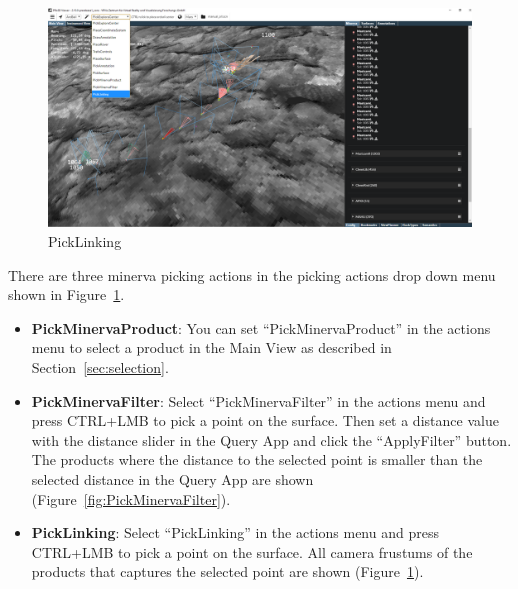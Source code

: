 \begin{figure}[h]
				\centering
					\includegraphics[width=1\textwidth]{pics/PickLinking1.png}
				\caption[Pick Linking]{PickLinking}
				\label{fig:PickLinking}
		 \end{figure}
		

There are three minerva picking actions in the picking actions drop down menu shown in Figure~\ref{fig:PickLinking}.
\\
\begin{itemize}
  \item \textbf{PickMinervaProduct}: You can set ``PickMinervaProduct'' in the actions menu to select a product in the Main View as described in Section~\ref{sec:selection}.
	\item \textbf{PickMinervaFilter}: Select ``PickMinervaFilter'' in the actions menu and press CTRL+LMB to pick a point on the surface. Then set a distance value with the distance slider in the Query App and click the ``ApplyFilter'' button. The products where the distance to the selected point is smaller than the selected distance in the Query App are shown (Figure~\ref{fig:PickMinervaFilter}).
	\item \textbf{PickLinking}: Select ``PickLinking'' in the actions menu and press CTRL+LMB to pick a point on the surface. All camera frustums of the products that captures the selected point are shown (Figure~\ref{fig:PickLinking}).
\end{itemize}

